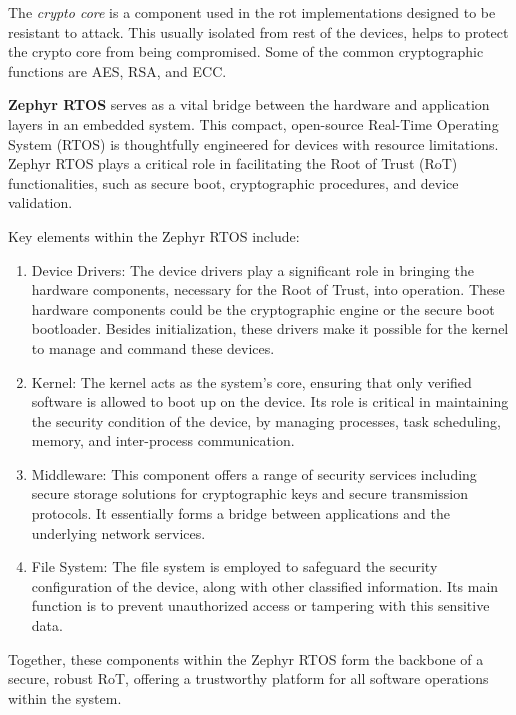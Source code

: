 The \textit{crypto core} is a component used in the \gls{rot} implementations
designed to be resistant to attack. This usually isolated from rest of the devices, helps
to protect the crypto core from being compromised. Some of the common cryptographic functions
are AES\cite{nechvatal2001report}, RSA\cite{milanov2009rsa}, and ECC\cite{bos2014elliptic}.

\textbf{Zephyr RTOS\cite{Security75:online}\cite{ZephyrPr4:online}\cite{ZephyrPr92:online}}
serves as a vital bridge between the hardware and application layers in an embedded system.
This compact, open-source Real-Time Operating System (RTOS) is thoughtfully engineered for devices
with resource limitations. Zephyr RTOS plays a critical role in facilitating the Root of Trust (RoT)
functionalities, such as secure boot, cryptographic procedures,
and device validation\cite{Security75:online}\cite{ZephyrPr4:online}\cite{ZephyrPr92:online}.

Key elements within the Zephyr RTOS include:
\begin{enumerate}
\item Device Drivers: The device drivers play a significant role in bringing the hardware
components, necessary for the Root of Trust, into operation. These hardware components
could be the cryptographic engine or the secure boot bootloader. Besides initialization,
these drivers make it possible for the kernel to manage and command these devices.
\item Kernel\cite{Kernelin72:online}: The kernel acts as the system's core, ensuring that only verified software is allowed
to boot up on the device. Its role is critical in maintaining the security condition
of the device, by managing processes, task scheduling, memory, and inter-process communication.
\item Middleware: This component offers a range of security services including secure storage
solutions for cryptographic keys and secure transmission protocols. It essentially forms a bridge
between applications and the underlying network services.
\item File System: The file system is employed to safeguard the security configuration
of the device, along with other classified information. Its main function is to prevent
unauthorized access or tampering with this sensitive data.
\end{enumerate}
Together, these components within the Zephyr RTOS form the backbone of a secure, robust RoT,
offering a trustworthy platform for all software operations within the system.

